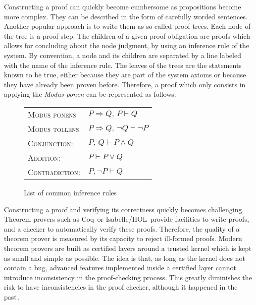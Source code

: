 Constructing a proof can quickly become cumbersome as propositions become more
complex.
%
They can be described in the form of carefully worded sentences.
%
Another popular approach is to write them as so-called proof trees.
%
Each node of the tree is a proof step.
%
The children of a given proof obligation are proofs which allows for concluding
about the node judgment, by using an inference rule of the system.
%
By convention, a node and its children are separated by a line labeled with the
name of the inference rule.
%
The leaves of the trees are the statements known to be true, either because they
are part of the system axioms or because they have already been proven before.
%
Therefore, a proof which only consists in applying the \emph{Modus ponen} can be
represented as follows:
%
\begin{prooftree}
     
\end{prooftree}

\begin{figure}
  \begin{center}
    \begin{tabular}{ll}
      {\scshape Modus ponens} & \( P \Rightarrow Q\text{, }P \vdash Q \) \\
      {\scshape Modus tollens} &
                                 \( P \Rightarrow Q\text{, }\neg Q \vdash \neg P \) \\
      {\scshape Conjunction:} & \( P\text{, }Q \vdash P \wedge Q \) \\
      {\scshape Addition:} & \( P \vdash P \vee Q \) \\
      {\scshape Contradiction:} & \( P, \neg P \vdash Q \)
    \end{tabular}
  \end{center}

  \caption{List of common inference rules}
  \label{fig:sota:inference}
\end{figure}

Constructing a proof and verifying its correctness quickly becomes challenging.
%
Theorem provers such as Coq\,\cite{coq} or
Isabelle/HOL\,\cite{nipkow2002isabelle} provide facilities to write proofs, and
a checker to automatically verify these proofs.
%
Therefore, the quality of a theorem prover is measured by its capacity to reject
ill-formed proofs.
%
Modern theorem provers are built as certified layers  around a trusted kernel which is kept as small and simple as possible.
%
The idea is that, as long as the kernel does not contain a bug, advanced
features implemented inside a certified layer cannot introduce inconsistency in
the proof-checking process.
%
This greatly diminishes the risk to have inconsistencies in the proof checker,
although it happened in the
past\,\cite{claret2015falso,griffioen1998comparison}.

